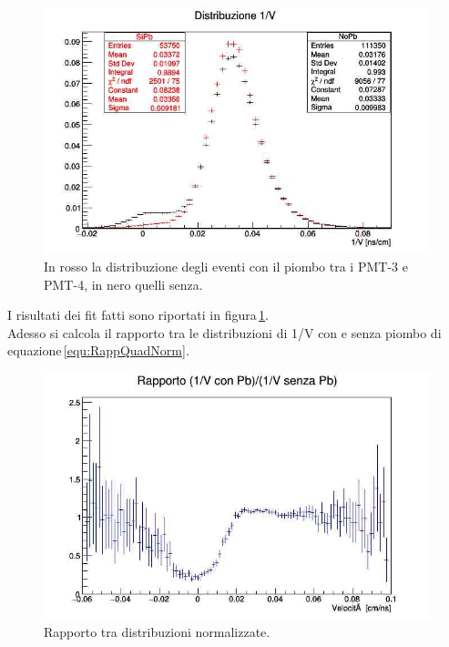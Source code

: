 \documentclass[a4paper,twocolumn]{article}
\begin{document}
\begin{figure}[H]
\centering
\includegraphics[scale=0.4]{./immagini/TimeOfFlight/Distr1SuVQuadNormFore.jpg}
\caption{In rosso la distribuzione degli eventi con il piombo tra i PMT-3 e PMT-4, in nero quelli senza.}
\label{fig:DistrQuadNorm}
\end{figure}

I risultati dei fit fatti sono riportati in figura\,\ref{fig:DistrQuadNorm}.\\
Adesso si calcola il rapporto tra le distribuzioni di 1/V con e senza piombo di equazione\,\ref{equ:RappQuadNorm}.

\begin{figure}[H]
\begin{center}
\includegraphics[scale=0.4]{./immagini/TimeOfFlight/Rapp1SuVQuadNorm.jpg}
\end{center}
\caption{Rapporto tra distribuzioni normalizzate.}
\label{fig:1SuVRappFore}
\end{figure}
\end{document}
